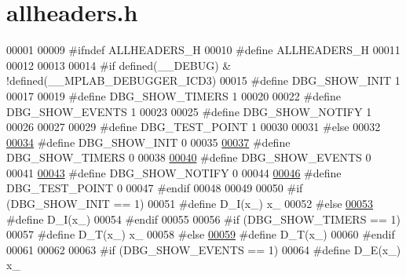 \hypertarget{a00040_source}{\section{allheaders.\+h}
\label{a00040_source}
}

\begin{DoxyCode}
00001 
00009 \textcolor{preprocessor}{#ifndef ALLHEADERS\_H}
00010 \textcolor{preprocessor}{#define ALLHEADERS\_H}
00011 
00012 
00013 
00014 \textcolor{preprocessor}{#if  defined(\_\_DEBUG) & !defined(\_\_MPLAB\_DEBUGGER\_ICD3) }
00015 \textcolor{preprocessor}{#define DBG\_SHOW\_INIT    1}
00017 
00019 \textcolor{preprocessor}{#define DBG\_SHOW\_TIMERS  1}
00020 
00022 \textcolor{preprocessor}{#define DBG\_SHOW\_EVENTS  1}
00023 
00025 \textcolor{preprocessor}{#define DBG\_SHOW\_NOTIFY  1}
00026 
00027 
00029 \textcolor{preprocessor}{#define DBG\_TEST\_POINT  1}
00030 
00031 \textcolor{preprocessor}{#else}
00032 
\hypertarget{a00040_source_l00034}{}\hyperlink{a00040_a3f5985ec802de602e1ec6c5f35cf45ac}{00034} \textcolor{preprocessor}{#define DBG\_SHOW\_INIT    0}
00035 
\hypertarget{a00040_source_l00037}{}\hyperlink{a00040_a696094a227f00f646c71694eba56c239}{00037} \textcolor{preprocessor}{#define DBG\_SHOW\_TIMERS  0}
00038 
\hypertarget{a00040_source_l00040}{}\hyperlink{a00040_ac99a26a91700184ca9c836b8837fc9c2}{00040} \textcolor{preprocessor}{#define DBG\_SHOW\_EVENTS  0}
00041 
\hypertarget{a00040_source_l00043}{}\hyperlink{a00040_aeba6fb01c031645d68a352c3e617724f}{00043} \textcolor{preprocessor}{#define DBG\_SHOW\_NOTIFY  0}
00044 
\hypertarget{a00040_source_l00046}{}\hyperlink{a00040_ae48f2746c700061f944a2747a966863c}{00046} \textcolor{preprocessor}{#define DBG\_TEST\_POINT  0}
00047 \textcolor{preprocessor}{#endif}
00048 
00049 
00050 \textcolor{preprocessor}{#if (DBG\_SHOW\_INIT == 1)}
00051 \textcolor{preprocessor}{#define D\_I(x\_) x\_}
00052 \textcolor{preprocessor}{#else}
\hypertarget{a00040_source_l00053}{}\hyperlink{a00040_a41b841dd3ca98f243a56ff65652be225}{00053} \textcolor{preprocessor}{#define D\_I(x\_)}
00054 \textcolor{preprocessor}{#endif}
00055 
00056 \textcolor{preprocessor}{#if (DBG\_SHOW\_TIMERS == 1)}
00057 \textcolor{preprocessor}{#define D\_T(x\_) x\_}
00058 \textcolor{preprocessor}{#else}
\hypertarget{a00040_source_l00059}{}\hyperlink{a00040_a5e876f6543757da83f9b3ddee08dece7}{00059} \textcolor{preprocessor}{#define D\_T(x\_)}
00060 \textcolor{preprocessor}{#endif}
00061 
00062 
00063 \textcolor{preprocessor}{#if (DBG\_SHOW\_EVENTS == 1)}
00064 \textcolor{preprocessor}{#define D\_E(x\_) x\_}

\end{DoxyCode}
